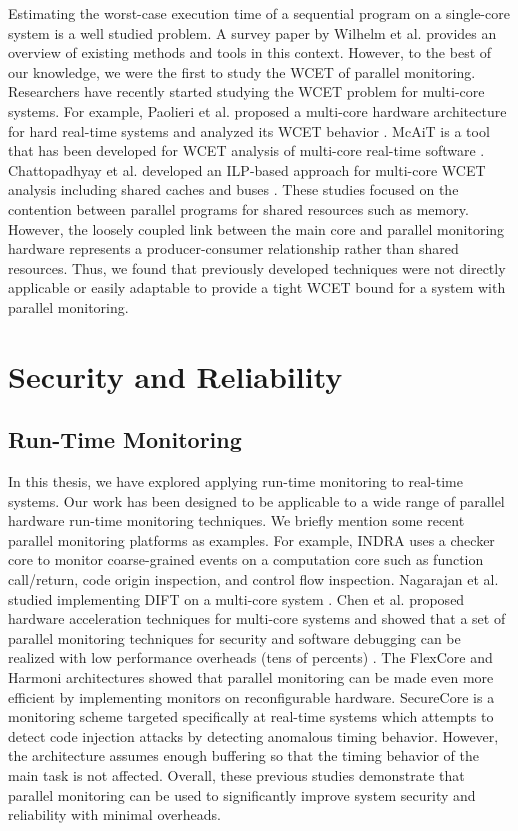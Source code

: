 Estimating the worst-case execution time of a sequential program on a
single-core system is a well studied problem. A survey paper by Wilhelm et al.
\cite{wcetsurvey-tecs08} provides an overview of existing methods and tools in
this context.  However, to the best of our knowledge, we were the
first to study the WCET of parallel monitoring.  Researchers have recently
started studying the WCET problem for multi-core systems. For example,
Paolieri et al. proposed a multi-core hardware architecture for hard real-time
systems and analyzed its WCET behavior \cite{paolieri-isca09}.  McAiT is a tool
that has been developed for WCET analysis of multi-core real-time software
\cite{mcait-rtss10}. Chattopadhyay et al. developed an ILP-based approach for
multi-core WCET analysis including shared caches and buses
\cite{chattopadhyay-rtas12}. These studies focused on the contention between
parallel programs for shared resources such as memory. However, the loosely
coupled link between the main core and parallel monitoring hardware represents
a producer-consumer relationship rather than shared resources. Thus, we found
that previously developed techniques were not directly applicable or easily
adaptable to provide a tight WCET bound for a system with parallel monitoring.

\section{Security and Reliability}
\label{sec:related_work.security}

\subsection{Run-Time Monitoring}

In this thesis, we have explored applying run-time monitoring to real-time
systems. Our work has been designed to be applicable to a wide range of
parallel hardware run-time monitoring techniques.  We briefly mention some
recent parallel monitoring platforms as examples. For example, INDRA
\cite{indra-isca06} uses a checker core to monitor coarse-grained events on a
computation core such as function call/return, code origin inspection, and
control flow inspection.  Nagarajan et al. studied implementing DIFT on a
multi-core system \cite{nagarajan-interact08}.  Chen et al. proposed hardware
acceleration techniques for multi-core systems and showed that a set of
parallel monitoring techniques for security and software debugging can be
realized with low performance overheads (tens of percents) \cite{lba-isca08}.
The FlexCore \cite{flexcore-micro10} and Harmoni \cite{harmoni-dsn12}
architectures showed that parallel monitoring can be made even more efficient
by implementing monitors on reconfigurable hardware. SecureCore
\cite{yoon-securecore-rtas13} is a monitoring scheme targeted specifically at
real-time systems which attempts to detect code injection attacks by detecting
anomalous timing behavior. However, the architecture assumes enough buffering
so that the timing behavior of the main task is not affected. Overall, these
previous studies demonstrate that parallel monitoring can be used to
significantly improve system security and reliability with minimal overheads.

